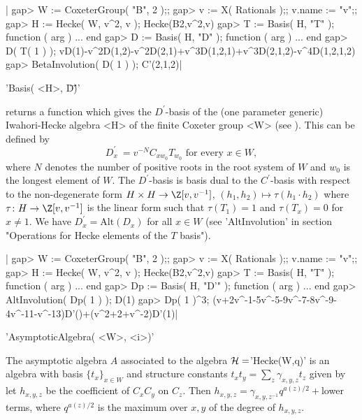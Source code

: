 |    gap> W := CoxeterGroup( "B", 2 );;
    gap> v := X( Rationals );; v.name := "v";;
    gap> H := Hecke( W, v^2, v );
    Hecke(B2,v^2,v)
    gap> T := Basis( H, "T" );
    function ( arg ) ... end
    gap> D := Basis( H, "D" );
    function ( arg ) ... end
    gap> D( T( 1 ) );
    vD(1)-v^2D(1,2)-v^2D(2,1)+v^3D(1,2,1)+v^3D(2,1,2)-v^4D(1,2,1,2)
    gap> BetaInvolution( D( 1 ) );
    C'(2,1,2)|


'Basis( <H>, \"D\'\" )'

returns  a function which gives the  $D^\prime$-basis of the (one parameter
generic)  Iwahori-Hecke algebra  <H> of  the finite  Coxeter group <W> (see
\cite[(5.1)]{Lus85}).   This   can   be   defined   by  $$  D_x^\prime  \:=
v^{-N}C_{xw_0}  T_{w_0} \mbox{ for  every $x \in  W$}, $$ where $N$ denotes
the  number of positive  roots in the  root system of  $W$ and $w_0$ is the
longest  element  of  $W$.  The  $D^\prime$-basis  is  basis  dual  to  the
$C^\prime$-basis  with  respect  to  the  non-degenerate  form  $H \times H
\rightarrow  \Z[v,v^{-1}]$, $(h_1,h_2)  \mapsto \tau(h_1  \cdot h_2)$ where
$\tau  \colon  H  \rightarrow  \Z[v,v^{-1}]$  is  the linear form such that
$\tau(T_1)=1$ and $\tau(T_x)=0$ for $x \ne 1$. We have
$D_x^\prime=\text{Alt}(D_x)$  for  all  $x  \in  W$ (see 'AltInvolution' in
section "Operations for Hecke elements of the $T$ basis").

|    gap> W := CoxeterGroup( "B", 2 );;
    gap> v := X( Rationals );; v.name := "v";;
    gap> H := Hecke( W, v^2, v );
    Hecke(B2,v^2,v)
    gap> T := Basis( H, "T" );
    function ( arg ) ... end
    gap> Dp := Basis( H, "D'" );
    function ( arg ) ... end
    gap> AltInvolution( Dp( 1 ) );
    D(1)
    gap> Dp( 1 )^3;
    (v+2v^-1-5v^-5-9v^-7-8v^-9-4v^-11-v^-13)D'()+(v^2+2+v^-2)D'(1)|


'AsymptoticAlgebra( <W>, <i>)'

The  asymptotic algebra $A$ associated to the algebra ${\mathcal H}=$'Hecke(W,q)' is
an   algebra  with   basis  $\{t_x\}_{x\in   W}$  and  structure  constants
$t_xt_y=\sum_z\gamma_{x,y,z}   t_z$  given  by\:  let  $h_{x,y,z}$  be  the
coefficient  of  $C_x  C_y$  on  $C_z$. Then $h_{x,y,z}=\gamma_{x,y,z^{-1}}
q^{a(z)/2}+$lower  terms, where $q^{a(z)/2}$  is the maximum  over $x,y$ of
the degree of $h_{x,y,z}$.

